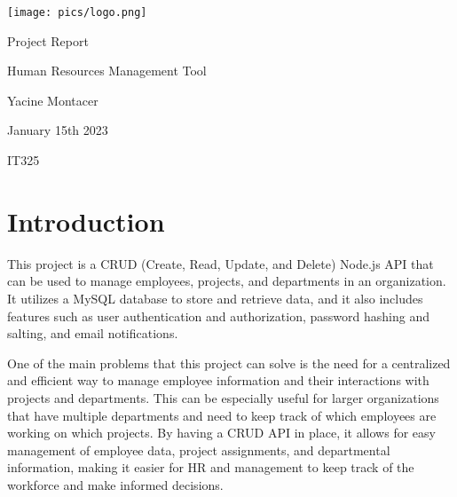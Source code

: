 \documentclass[12pt]{article}
\begin{document}
	\begin{titlepage}
		\begin{center}
			
			\texttt{[image: pics/logo.png]}
			\vspace*{5cm}
			
			\Huge{Project Report}
			
			\vspace{0.5cm}
			\LARGE{Human Resources Management Tool}
			
			\vspace{3 cm}
			\Large{}
			
			\vspace{0.25cm}
			\large{Yacine Montacer}
			
			\vspace{3 cm}
			\Large{January 15th 2023}
			
			\vspace{0.25 cm}
			\Large{IT325}
			
			
			\vfill
		\end{center}
	\end{titlepage}
	
	\setcounter{page}{2}
	\pagestyle{fancy}
	\fancyhf{}
	\rhead{\thepage}
	\lhead{}
	
	\section*{Introduction}
	
	This project is a CRUD (Create, Read, Update, and Delete) Node.js API that can be used to manage employees, projects, and departments in an organization. It utilizes a MySQL database to store and retrieve data, and it also includes features such as user authentication and authorization, password hashing and salting, and email notifications.
	
	One of the main problems that this project can solve is the need for a centralized and efficient way to manage employee information and their interactions with projects and departments. This can be especially useful for larger organizations that have multiple departments and need to keep track of which employees are working on which projects. By having a CRUD API in place, it allows for easy management of employee data, project assignments, and departmental information, making it easier for HR and management to keep track of the workforce and make informed decisions.
	
\end{document}
